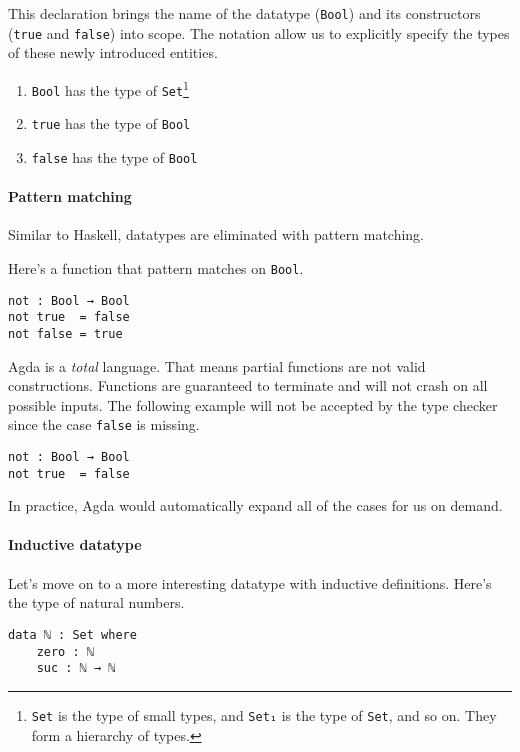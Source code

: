 \documentclass[../thesis.tex]{subfiles}
\begin{document}
This declaration brings the name of the datatype ({\lstinline|Bool|})
and its constructors ({\lstinline|true|} and {\lstinline|false|}) into scope.
The notation allow us to explicitly specify the types of these newly introduced
entities.

\begin{enumerate}
    \item {\lstinline|Bool|} has the type of {\lstinline|Set|}\footnote{{\lstinline|Set|} is the type of small types, and {\lstinline|Set₁|} is the type
of {\lstinline|Set|}, and so on. They form a hierarchy of types.}
    \item {\lstinline|true|} has the type of {\lstinline|Bool|}
    \item {\lstinline|false|} has the type of {\lstinline|Bool|}
\end{enumerate}

\paragraph{Pattern matching}
Similar to Haskell, datatypes are eliminated with pattern matching.

Here's a function that pattern matches on {\lstinline|Bool|}.

\begin{lstlisting}
not : Bool → Bool
not true  = false
not false = true
\end{lstlisting}

Agda is a \textit{total} language.
That means partial functions are not valid constructions.
Functions are guaranteed to terminate and will not crash on all possible inputs.
The following example will not be accepted by the type checker since the case
{\lstinline|false|} is missing.

\begin{lstlisting}
not : Bool → Bool
not true  = false
\end{lstlisting}

In practice, Agda would automatically expand all of the cases for us on demand.

\paragraph{Inductive datatype} Let's move on to a more interesting datatype with
inductive definitions. Here's the type of natural numbers.
\begin{lstlisting}
data ℕ : Set where
    zero : ℕ
    suc : ℕ → ℕ
\end{lstlisting}
\end{document}
